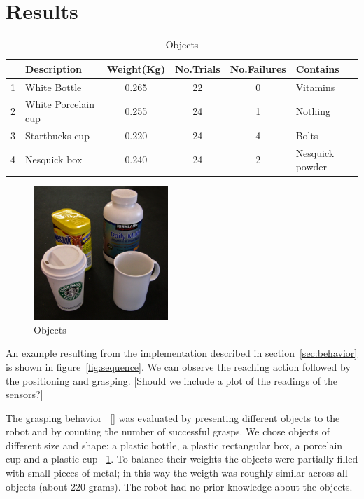 \section{Results}
\label{sec:results}

\begin{table}[tb]
  \caption{Objects} \label{tab:objects} \centering
  \begin{tabular}{|c|l|c|c|c|l|}
    \hline
    &Description& Weight(Kg)&No.Trials&No.Failures&Contains \\
    \hline
    1&White Bottle        & 0.265 & 22& 0 & Vitamins\\
    2&White Porcelain cup & 0.255 & 24& 1 & Nothing\\
    3&Startbucks cup      & 0.220 & 24& 4 & Bolts \\
    4&Nesquick box        & 0.240 & 24& 2 & Nesquick powder\\

    \hline
  \end{tabular}
\end{table}

\begin{figure}[tbp]
\centerline{
\includegraphics[width=2.0in]{./figures/objects.eps}
}\caption{Objects}
\label{fig:Objects}
\end{figure}

An example resulting from the implementation described in
section~\ref{sec:behavior} is shown in figure~\ref{fig:sequence}.
We can observe the reaching action followed by the positioning and
grasping. [Should we include a plot of the readings of the
sensors?]

The grasping behavior ~\ref{} was evaluated by presenting different 
objects to the robot and by counting the number of successful grasps. 
We chose objects of different size and shape: 
a plastic bottle, a plastic rectangular box, a porcelain cup 
and a plastic cup ~\ref{fig:Objects}. To balance their weights 
the objects were partially filled with small pieces of metal; in this way the 
weigth was roughly similar across all objects (about 220 grams). 
The robot had no prior knowledge about the objects.

